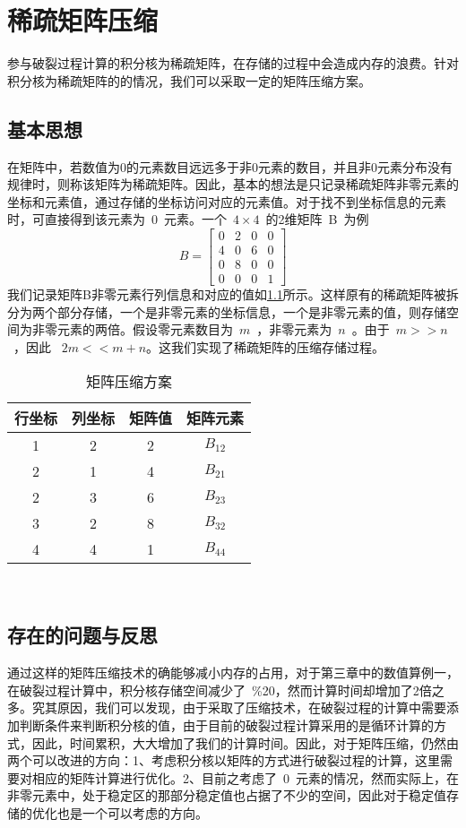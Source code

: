 \appendix
\chapter{稀疏矩阵压缩}

\indent 参与破裂过程计算的积分核为稀疏矩阵，在存储的过程中会造成内存的浪费。针对积分核为稀疏矩阵的的情况，我们可以采取一定的矩阵压缩方案。

\section{基本思想}
\indent 在矩阵中，若数值为0的元素数目远远多于非0元素的数目，并且非0元素分布没有规律时，则称该矩阵为稀疏矩阵。因此，基本的想法是只记录稀疏矩阵非零元素的坐标和元素值，通过存储的坐标访问对应的元素值。对于找不到坐标信息的元素时，可直接得到该元素为~0~元素。一个~$4 \times 4$~的2维矩阵~B~为例
$$ B = 
\begin{bmatrix}
   0 & 2 & 0& 0 \\
   4 & 0 & 6 & 0\\
   0 & 8 & 0 & 0\\
   0 & 0 & 0 & 1
  \end{bmatrix} \tag{三维稀疏矩阵}
 $$
 我们记录矩阵B非零元素行列信息和对应的值如\ref{juzhen-yasuo}所示。这样原有的稀疏矩阵被拆分为两个部分存储，一个是非零元素的坐标信息，一个是非零元素的值，则存储空间为非零元素的两倍。假设零元素数目为~$m$~，非零元素为~$n$~。由于~$m>>n$~，因此 ~$2m<<m+n$。这我们实现了稀疏矩阵的压缩存储过程。

\begin{table}
\centering  
\caption{矩阵压缩方案} \label{juzhen-yasuo} 
\begin{tabular}{|c|c|c|c|}
 \hline
行坐标&列坐标& 矩阵值& 矩阵元素\\
 \hline
1 & 2 & 2& $B_{12}$ \\
 \hline
2&1 & 4 &  $B_{21}$\\
 \hline
2 & 3 & 6& $B_{23}$\\
 \hline
3 & 2 & 8& $B_{32}$ \\
 \hline
4 & 4 & 1& $B_{44}$ \\
\hline
\end{tabular}\\
\end{table}


 \section{存在的问题与反思}
 \indent 通过这样的矩阵压缩技术的确能够减小内存的占用，对于第三章中的数值算例一，在破裂过程计算中，积分核存储空间减少了~\%20，然而计算时间却增加了2倍之多。究其原因，我们可以发现，由于采取了压缩技术，在破裂过程的计算中需要添加判断条件来判断积分核的值，由于目前的破裂过程计算采用的是循环计算的方式，因此，时间累积，大大增加了我们的计算时间。因此，对于矩阵压缩，仍然由两个可以改进的方向：1、考虑积分核以矩阵的方式进行破裂过程的计算，这里需要对相应的矩阵计算进行优化。2、目前之考虑了~0~元素的情况，然而实际上，在非零元素中，处于稳定区的那部分稳定值也占据了不少的空间，因此对于稳定值存储的优化也是一个可以考虑的方向。
 
